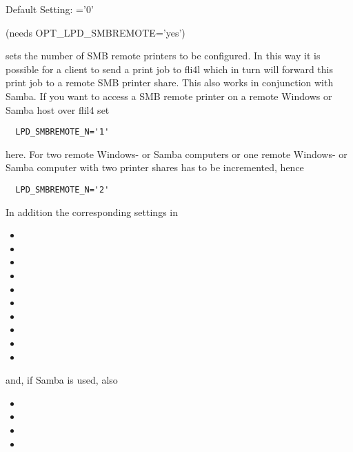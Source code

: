 \begin{description}
  Default Setting: ='0'

 (needs OPT\_LPD\_SMBREMOTE='yes')

   sets the number of SMB remote printers to be configured.
  In this way it is possible for a client to send a print job to fli4l which in turn
  will forward this print job to a remote SMB printer share.
  This also works in conjunction with Samba. If you want to access a
  SMB remote printer on a remote Windows or Samba host over flil4 set

\begin{example}
\begin{verbatim}
  LPD_SMBREMOTE_N='1'
\end{verbatim}
\end{example}

  here. For two remote Windows- or Samba computers or one remote Windows-
  or Samba computer with two printer shares 
  has to be incremented, hence

\begin{example}
\begin{verbatim}
  LPD_SMBREMOTE_N='2'
\end{verbatim}
\end{example}

  In addition the corresponding settings in

\begin{itemize}
\item {}
\item {}
\item {}
\item {}
\item {}
\item {}
\item {}
\item {}
\item {}
\item {}
\end{itemize}

  and, if Samba is used, also

\begin{itemize}
\item {}
\item {}
\item {}
\item {}
\end{itemize}


\end{description}
